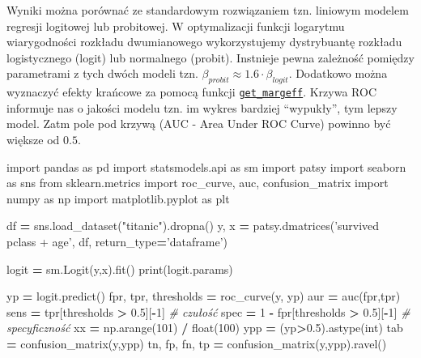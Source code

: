 \documentclass[polish,]{book}
\newenvironment{Shaded}{\begin{snugshade}}{\end{snugshade}}
\newcommand{\BuiltInTok}[1]{#1}
\newcommand{\CommentTok}[1]{\textcolor[rgb]{0.56,0.35,0.01}{\textit{#1}}}
\newcommand{\DecValTok}[1]{\textcolor[rgb]{0.00,0.00,0.81}{#1}}
\newcommand{\FloatTok}[1]{\textcolor[rgb]{0.00,0.00,0.81}{#1}}
\newcommand{\ImportTok}[1]{#1}
\newcommand{\NormalTok}[1]{#1}
\newcommand{\OperatorTok}[1]{\textcolor[rgb]{0.81,0.36,0.00}{\textbf{#1}}}
\newcommand{\StringTok}[1]{\textcolor[rgb]{0.31,0.60,0.02}{#1}}
\begin{document}
Wyniki można porównać ze standardowym rozwiązaniem tzn. liniowym modelem regresji logitowej lub probitowej. W optymalizacji funkcji logarytmu wiarygodności rozkładu dwumianowego wykorzystujemy dystrybuantę rozkładu logistycznego (logit) lub normalnego (probit). Instnieje pewna zależność pomiędzy parametrami z tych dwóch modeli tzn. \(\beta_{probit} \approx 1.6\cdot\beta_{logit}\). Dodatkowo można wyznaczyć efekty krańcowe za pomocą funkcji \href{https://www.statsmodels.org/dev/generated/statsmodels.discrete.discrete_model.CountResults.get_margeff.html}{\texttt{get\_margeff}}. Krzywa ROC informuje nas o jakości modelu tzn. im wykres bardziej ``wypukły'', tym lepszy model. Zatm pole pod krzywą (AUC - Area Under ROC Curve) powinno być większe od \(0.5\).

\begin{Shaded}
\begin{Highlighting}[]
\ImportTok{import}\NormalTok{ pandas }\ImportTok{as}\NormalTok{ pd}
\ImportTok{import}\NormalTok{ statsmodels.api }\ImportTok{as}\NormalTok{ sm}
\ImportTok{import}\NormalTok{ patsy}
\ImportTok{import}\NormalTok{ seaborn }\ImportTok{as}\NormalTok{ sns}
\ImportTok{from}\NormalTok{ sklearn.metrics }\ImportTok{import}\NormalTok{ roc_curve, auc, confusion_matrix}
\ImportTok{import}\NormalTok{ numpy }\ImportTok{as}\NormalTok{ np}
\ImportTok{import}\NormalTok{ matplotlib.pyplot }\ImportTok{as}\NormalTok{ plt}

\NormalTok{df }\OperatorTok{=}\NormalTok{ sns.load_dataset(}\StringTok{"titanic"}\NormalTok{).dropna()}
\NormalTok{y, x }\OperatorTok{=}\NormalTok{ patsy.dmatrices(}\StringTok{'survived ~ pclass + age'}\NormalTok{, df, return_type}\OperatorTok{=}\StringTok{'dataframe'}\NormalTok{)}
      
\NormalTok{logit }\OperatorTok{=}\NormalTok{ sm.Logit(y,x).fit()}
\BuiltInTok{print}\NormalTok{(logit.params)}

\NormalTok{yp }\OperatorTok{=}\NormalTok{ logit.predict()}
\NormalTok{fpr, tpr, thresholds }\OperatorTok{=}\NormalTok{ roc_curve(y, yp)}
\NormalTok{aur }\OperatorTok{=}\NormalTok{ auc(fpr,tpr)}
\NormalTok{sens }\OperatorTok{=}\NormalTok{ tpr[thresholds }\OperatorTok{>} \FloatTok{0.5}\NormalTok{][}\OperatorTok{-}\DecValTok{1}\NormalTok{]     }\CommentTok{# czułość}
\NormalTok{spec }\OperatorTok{=} \DecValTok{1} \OperatorTok{-}\NormalTok{ fpr[thresholds }\OperatorTok{>} \FloatTok{0.5}\NormalTok{][}\OperatorTok{-}\DecValTok{1}\NormalTok{] }\CommentTok{# specyficzność}
\NormalTok{xx }\OperatorTok{=}\NormalTok{ np.arange(}\DecValTok{101}\NormalTok{) }\OperatorTok{/} \BuiltInTok{float}\NormalTok{(}\DecValTok{100}\NormalTok{)}
\NormalTok{ypp }\OperatorTok{=}\NormalTok{ (yp}\OperatorTok{>}\FloatTok{0.5}\NormalTok{).astype(}\BuiltInTok{int}\NormalTok{)}
\NormalTok{tab }\OperatorTok{=}\NormalTok{ confusion_matrix(y,ypp)}
\NormalTok{tn, fp, fn, tp }\OperatorTok{=}\NormalTok{ confusion_matrix(y,ypp).ravel()}


\end{Highlighting}
\end{Shaded}
\end{document}

